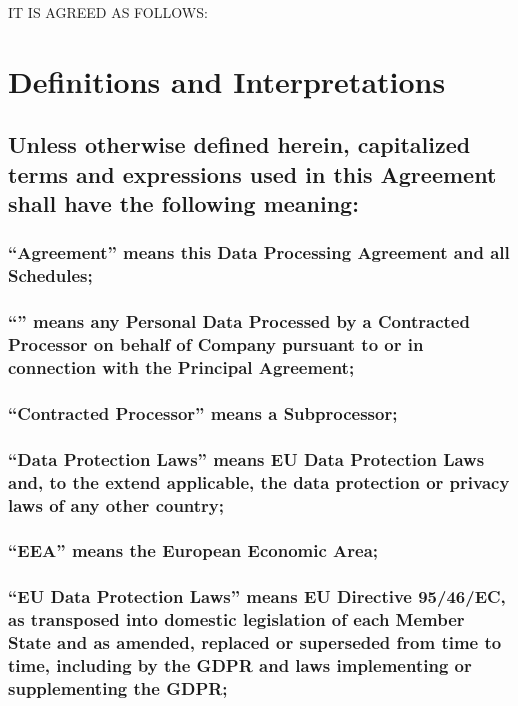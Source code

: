 \documentclass[a4paper]{article}
\begin{document}
IT IS AGREED AS FOLLOWS:

\section{Definitions and Interpretations}

\subsection{Unless otherwise defined herein, capitalized terms and expressions used in this Agreement shall have the following meaning:}

\subsubsection{\textbf{``Agreement''} means this Data Processing Agreement and all Schedules;}

\subsubsection{\textbf{``''} means any Personal Data Processed by a Contracted Processor on behalf of Company pursuant to or in connection with the Principal Agreement;}

\subsubsection{\textbf{``Contracted Processor''} means a Subprocessor;}

\subsubsection{\textbf{``Data Protection Laws''} means EU Data Protection Laws and, to the extend applicable, the data protection or privacy laws of any other country;}

\subsubsection{\textbf{``EEA''} means the European Economic Area;}

\subsubsection{\textbf{``EU Data Protection Laws''} means EU Directive 95/46/EC, as transposed into domestic legislation of each Member State and as amended, replaced or superseded from time to time, including by the GDPR and laws implementing or supplementing the GDPR;}
\end{document}
